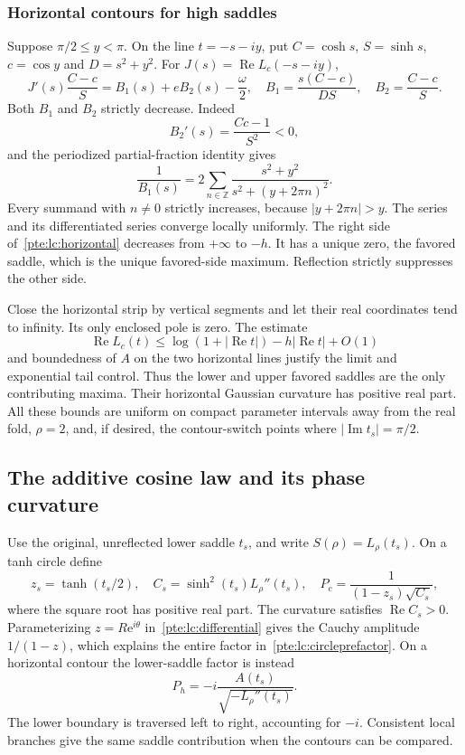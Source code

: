 \documentclass[11pt,a4paper]{article}
\numberwithin{equation}{section}
\theoremstyle{definition}
\theoremstyle{plain}
\newcommand{\ee}{\mathrm e}
\begin{document}
\subsubsection{Horizontal contours for high saddles}
Suppose $\pi/2\le y<\pi$. On the line $t=-s-iy$, put $C=\cosh s$, $S=\sinh s$, $c=\cos y$ and $D=s^2+y^2$. For $J(s)=\operatorname{Re}L_c(-s-iy)$,
\begin{equation}\label{pte:lc:horizontal}
 J'(s)\frac{C-c}{S}=B_1(s)+eB_2(s)-\frac\omega2,
 \quad B_1=\frac{s(C-c)}{DS},\quad B_2=\frac{C-c}{S}.
\end{equation}
Both $B_1$ and $B_2$ strictly decrease. Indeed
\[
 B_2'(s)=\frac{C c-1}{S^2}<0,
\]
and the periodized partial-fraction identity gives
\begin{equation}\label{pte:lc:B1}
 \frac1{B_1(s)}=2\sum_{n\in\mathbb Z}
 \frac{s^2+y^2}{s^2+(y+2\pi n)^2}.
\end{equation}
Every summand with $n\ne0$ strictly increases, because $|y+2\pi n|>y$. The series and its differentiated series converge locally uniformly. The right side of~\eqref{pte:lc:horizontal} decreases from $+\infty$ to $-h$. It has a unique zero, the favored saddle, which is the unique favored-side maximum. Reflection strictly suppresses the other side.

Close the horizontal strip by vertical segments and let their real coordinates tend to infinity. Its only enclosed pole is zero. The estimate
\[
 \operatorname{Re}L_c(t)\le \log(1+|\operatorname{Re}t|)
                       -h|\operatorname{Re}t|+O(1)
\]
and boundedness of $A$ on the two horizontal lines justify the limit and exponential tail control. Thus the lower and upper favored saddles are the only contributing maxima. Their horizontal Gaussian curvature has positive real part. All these bounds are uniform on compact parameter intervals away from the real fold, $\rho=2$, and, if desired, the contour-switch points where $|\operatorname{Im}t_s|=\pi/2$.

\subsection{The additive cosine law and its phase curvature}
Use the original, unreflected lower saddle $t_s$, and write $S(\rho)=L_\rho(t_s)$.
On a tanh circle define
\begin{equation}\label{pte:lc:circleprefactor}
 z_s=\tanh(t_s/2),\quad C_s=\sinh^2(t_s)L_\rho''(t_s),\quad
 P_c=\frac1{(1-z_s)\sqrt{C_s}},
\end{equation}
where the square root has positive real part. The curvature satisfies $\operatorname{Re}C_s>0$. Parameterizing $z=R\ee^{i\theta}$ in~\eqref{pte:lc:differential} gives the Cauchy amplitude $1/(1-z)$, which explains the entire factor in~\eqref{pte:lc:circleprefactor}. On a horizontal contour the lower-saddle factor is instead
\begin{equation}\label{pte:lc:horizontalprefactor}
 P_h=-i\frac{A(t_s)}{\sqrt{-L_\rho''(t_s)}}.
\end{equation}
The lower boundary is traversed left to right, accounting for $-i$. Consistent local branches give the same saddle contribution when the contours can be compared.
\end{document}
